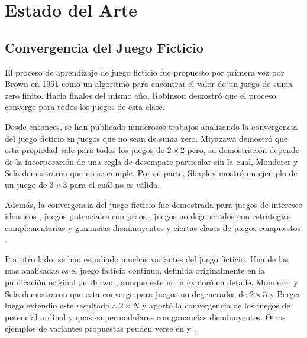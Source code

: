 \chapter{Estado del Arte}  \label{cap:relwork}

\section{Convergencia del Juego Ficticio}

El proceso de aprendizaje de juego ficticio fue propuesto por primera vez por Brown en 1951 \cite{brown:1951} como un algoritmo para encontrar el valor de un juego de suma zero finito. Hacia finales del mismo año, Robinson \cite{robinson:zerosum} demostró que el proceso converge para todos los juegos de esta clase.

Desde entonces, se han publicado numerosos trabajos analizando la convergencia del juego ficticio en juegos que no sean de suma zero. Miyazawa \cite{miyazawa:2x2} demostró que esta propiedad vale para todos los juegos de $2 \times 2$ pero, su demostración depende de la incorporación de una regla de desempate particular sin la cual, Monderer y Sela \cite{2x2:without} demostraron que no se cumple. Por su parte, Shapley \cite{shapley:3x3} mostró un ejemplo de un juego de $3 \times 3$ para el cuál no es válida.

Además, la convergencia del juego ficticio fue demostrada para juegos de intereses identicos \cite{identical:interests}, juegos potenciales con pesos \cite{weighted:potential}, juegos no degenerados con estrategias complementarias y ganancias disminuyentes \cite{strategic:complementarities} y ciertas clases de juegos compuestos \cite{compound}.

Por otro lado, se han estudiado muchas variantes del juego ficticio. Una de las mas analisadas es el juego ficticio continuo, definida originalmente en la publicación original de Brown \cite{brown:1951}, aunque este no la exploró en detalle. Monderer y Sela \cite{no:cycling} demostraron que esta converge para juegos no degenerados de $2 \times 3$ y Berger luego extendio este resultado a $2 \times N$ \cite{berger:2xn} y aportó la convergencia de los juegos de potencial ordinal y quasi-supermodulares con ganancias disminuyentes. Otros ejemplos de variantes propuestas peuden verse en \cite{pattern:recog} y \cite{new:kind:fp}.

